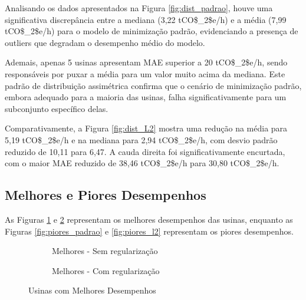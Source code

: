 Analisando os dados apresentados na Figura \ref{fig:dist_padrao}, houve uma significativa discrepância entre a mediana (3,22 \ac{tCO$_2$e}/h) e a média (7,99 \ac{tCO$_2$e}/h) para o modelo de minimização padrão, evidenciando a presença de outliers que degradam o desempenho médio do modelo.

Ademais, apenas 5 usinas apresentam \ac{MAE} superior a 20 \ac{tCO$_2$e}/h, sendo responsáveis por puxar a média para um valor muito acima da mediana. Este padrão de distribuição assimétrica confirma que o cenário de minimização padrão, embora adequado para a maioria das usinas, falha significativamente para um subconjunto específico delas.

Comparativamente, a Figura \ref{fig:dist_L2} mostra uma redução na média para 5,19 \ac{tCO$_2$e}/h e na mediana para 2,94 \ac{tCO$_2$e}/h, com desvio padrão reduzido de 10,11 para 6,47. A cauda direita foi significativamente encurtada, com o maior \ac{MAE} reduzido de 38,46 \ac{tCO$_2$e}/h para 30,80 \ac{tCO$_2$e}/h.

\subsection{Melhores e Piores Desempenhos}

As Figuras \ref{fig:melhores_padrao} e \ref{fig:melhores_l2} representam os melhores desempenhos das usinas, enquanto as Figuras \ref{fig:piores_padrao} e \ref{fig:piores_l2} representam os piores desempenhos.

\begin{figure}[H]
    \centering
    \begin{subfigure}{0.6\textwidth}
        \centering
        
        \caption{Melhores - Sem regularização}
        \label{fig:melhores_padrao}
    \end{subfigure}
    
    \vspace{0.5cm}
    
    \begin{subfigure}{0.6\textwidth}
        \centering
        
        \caption{Melhores - Com regularização}
        \label{fig:melhores_l2}
    \end{subfigure}
    \caption{Usinas com Melhores Desempenhos}
    \label{fig:melhores}
\end{figure}


